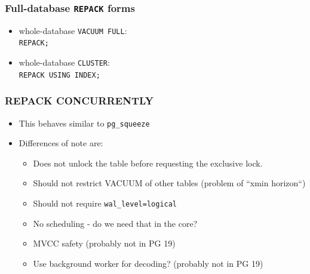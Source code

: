 \begin{frame}
  \frametitle{Full-database \texttt{REPACK} forms}
  \begin{itemize}
    \item whole-database \texttt{VACUUM FULL}: \\
      \texttt{REPACK;}
    \item whole-database \texttt{CLUSTER}: \\
      \texttt{REPACK USING INDEX;}
  \end{itemize}
\end{frame}

\begin{frame}
  \frametitle{REPACK CONCURRENTLY}
  \begin{itemize}
    \item This behaves similar to \texttt{pg\_squeeze}
    \item Differences of note are:
      \begin{itemize}
        \item Does not unlock the table before requesting the exclusive lock.
        \item Should not restrict VACUUM of other tables (problem of ``xmin
          horizon``)
        \item Should not require {\tt wal\_level=logical}
        \item No scheduling - do we need that in the core?
        \item MVCC safety (probably not in PG 19)
        \item Use background worker for decoding? (probably not in PG 19)
      \end{itemize}
  \end{itemize}

%
%
%
%
\end{frame}

